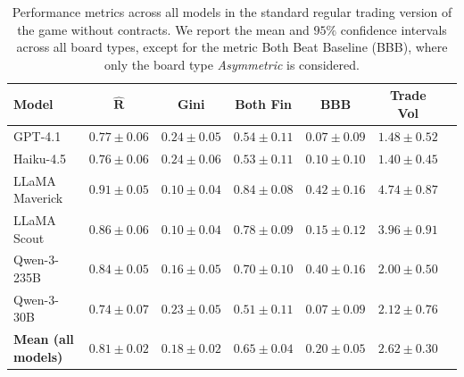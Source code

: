 \documentclass{article} %
\newcommand{\GPT}{GPT-4.1\xspace}
\newcommand{\Haiku}{Haiku-4.5\xspace}
\newcommand{\Maverick}{LLaMA Maverick\xspace}
\newcommand{\Scout}{LLaMA Scout\xspace}
\newcommand{\Qttf}{Qwen-3-235B\xspace}
\newcommand{\Qthirty}{Qwen-3-30B\xspace}
\begin{document}
\begin{table}[t]
\centering
\begin{small}
\begin{tabular}{lcccccc}
\toprule
\textbf{Model}
& \textbf{$\mathbf{\hat{R}}$}
& \textbf{Gini}
& \textbf{Both Fin}
& \textbf{BBB}
& \textbf{Trade Vol}
\\
\midrule
\GPT
& $0.77 \pm 0.06$
& $0.24 \pm 0.05$
& $0.54 \pm 0.11$
& $0.07 \pm 0.09$
& $1.48 \pm 0.52$
\\

\Haiku
& $0.76 \pm 0.06$
& $0.24 \pm 0.06$
& $0.53 \pm 0.11$
& $0.10 \pm 0.10$
& $1.40 \pm 0.45$
\\

\Maverick
& $0.91 \pm 0.05$
& $0.10 \pm 0.04$
& $0.84 \pm 0.08$
& $0.42 \pm 0.16$
& $4.74 \pm 0.87$
\\

\Scout
& $0.86 \pm 0.06$
& $0.10 \pm 0.04$
& $0.78 \pm 0.09$
& $0.15 \pm 0.12$
& $3.96 \pm 0.91$
\\

\Qttf
& $0.84 \pm 0.05$
& $0.16 \pm 0.05$
& $0.70 \pm 0.10$
& $0.40 \pm 0.16$
& $2.00 \pm 0.50$
\\

\Qthirty
& $0.74 \pm 0.07$
& $0.23 \pm 0.05$
& $0.51 \pm 0.11$
& $0.07 \pm 0.09$
& $2.12 \pm 0.76$
\\

\midrule
\textbf{Mean (all models)}
& $\mathbf{0.81 \pm 0.02}$
& $\mathbf{0.18 \pm 0.02}$
& $\mathbf{0.65 \pm 0.04}$
& $\mathbf{0.20 \pm 0.05}$
& $\mathbf{2.62 \pm 0.30}$
\\
\bottomrule
\end{tabular}
\end{small}
\caption{Performance metrics across all models in the standard regular trading version of the game without contracts. We report the mean and $95\%$ confidence intervals  across all board types, except for the metric Both Beat Baseline (BBB), where only the board type \textit{Asymmetric} is considered.}
\label{tab:model_performance_metrics_reg_trading}
\end{table}
\end{document}
